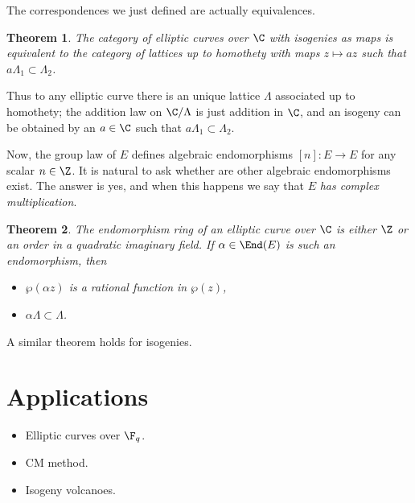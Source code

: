 \documentclass{article}
\newtheorem{theorem}{Theorem}
\begin{document}
The correspondences we just defined are actually equivalences.

\begin{theorem}
  The category of elliptic curves over $\C$ with isogenies as maps is
  equivalent to the category of lattices up to homothety with maps
  $z\mapsto az$ such that $a\Lambda_1\subset\Lambda_2$.
\end{theorem}

Thus to any elliptic curve there is an unique lattice $\Lambda$
associated up to homothety; the addition law on $\C/\Lambda$ is just
addition in $\C$, and an isogeny can be obtained by an $a\in\C$ such
that $a\Lambda_1\subset\Lambda_2$.

Now, the group law of $E$ defines algebraic endomorphisms $[n]:E\to E$
for any scalar $n\in\Z$. It is natural to ask whether are other
algebraic endomorphisms exist. The answer is yes, and when this
happens we say that $E$ \emph{has complex multiplication}.

\begin{theorem}
  The endomorphism ring of an elliptic curve over $\C$ is either $\Z$
  or an order in a quadratic imaginary field. If $\alpha\in\End(E)$ is
  such an endomorphism, then
  \begin{itemize}
  \item $\wp(\alpha z)$ is a rational function in $\wp(z)$,
  \item $\alpha\Lambda \subset \Lambda$.
  \end{itemize}
\end{theorem}

A similar theorem holds for isogenies.

\section{Applications}

\begin{itemize}
\item Elliptic curves over $\F_q$.
\item CM method.
\item Isogeny volcanoes.
\end{itemize}
\end{document}
